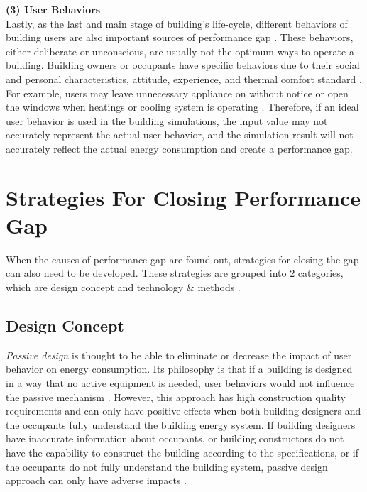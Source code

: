 \documentclass[a4paper, oneside]{discothesis}
\begin{document}
		\textbf{(3) User Behaviors}\\
		Lastly, as the last and main stage of building's life-cycle, different behaviors of building users are also important sources of performance gap \cite{ZOU2018165}. These behaviors, either deliberate or unconscious, are usually not the optimum ways to operate a building. Building owners or occupants have specific behaviors due to their social and personal characteristics, attitude, experience, and thermal comfort standard \cite{userevaluations,LAWRENCE2016651}. For example, users may leave unnecessary appliance on without notice or open the windows when heatings or cooling system is operating \cite{FREI2017421}. Therefore, if an ideal user behavior is used in the building simulations, the input value may not accurately represent the actual user behavior, and the simulation result will not accurately reflect the actual energy consumption and create a performance gap.\\

	\section{Strategies For Closing Performance Gap} 
		When the causes of performance gap are found out, strategies for closing the gap can also need to be developed. These strategies are grouped into 2 categories, which are design concept and technology \& methods \cite{ZOU2018165}.

		\subsection{Design Concept}
			\textit{Passive design} is thought to be able to eliminate or decrease the impact of user behavior on energy consumption. Its philosophy is that if a building is designed in a way that no active equipment is needed, user behaviors would not influence the passive mechanism \cite{BLIGHT2013183,NORFORD1994121}. However, this approach has high construction quality requirements and can only have positive effects when both building designers and the occupants fully understand the building energy system. If building designers have inaccurate information about occupants, or building constructors do not have the capability to construct the building according to the specifications, or if the occupants do not fully understand the building system, passive design approach can only have adverse impacts \cite{ZOU2018165}.\\
\end{document}
